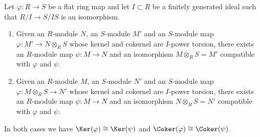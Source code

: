 \begin{lemma}
\label{lemma-application-formal-glueing}
Let $\varphi : R \to S$ be a flat ring map and let $I \subset R$ be a
finitely generated ideal such that $R/I \to S/IS$ is an isomorphism. 
\begin{enumerate}
\item Given an $R$-module $N$, an $S$-module $M'$ and an $S$-module
map $\varphi : M' \to N \otimes_R S$ whose kernel and cokernel are
$I$-power torsion, there exists an $R$-module map
$\psi : M \to N$ and an isomorphism $M \otimes_R S = M'$
compatible with $\varphi$ and $\psi$.
\item Given an $R$-module $M$, an $S$-module $N'$ and an $S$-module
map $\varphi : M \otimes_R S \to N'$ whose kernel and cokernel are
$I$-power torsion, there exists an $R$-module map
$\psi : M \to N$ and an isomorphism $N \otimes_R S = N'$
compatible with $\varphi$ and $\psi$.
\end{enumerate}
In both cases we have $\Ker(\varphi) \cong \Ker(\psi)$ and
$\Coker(\varphi) \cong \Coker(\psi)$.
\end{lemma}

